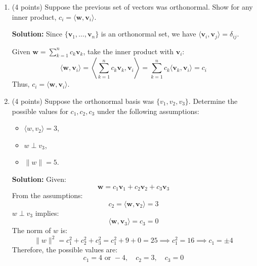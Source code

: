 \documentclass[12pt]{article}
\newcommand{\qspace}{\vspace{1em}} %
\newenvironment{solution}{\noindent\textbf{Solution:} }{\qspace}
\begin{document}
\begin{enumerate}
\begin{enumerate}
        \begin{solution}
        Suppose there exist two sets of scalars \( \{c_1, \ldots, c_n\} \) and \( \{c'_1, \ldots, c'_n\} \) such that:
        \[
        \mathbf{w} = \sum_{i=1}^n c_i \mathbf{v}_i = \sum_{i=1}^n c'_i \mathbf{v}_i
        \]
        Subtracting the equations:
        \[
        \sum_{i=1}^n (c_i - c'_i) \mathbf{v}_i = \mathbf{0}
        \]
        Since \( \{\mathbf{v}_1, \ldots, \mathbf{v}_n\} \) is linearly independent, it follows that \( c_i - c'_i = 0 \) for all \( i \). Therefore, \( c_i = c'_i \) for all \( i \), proving the uniqueness of the scalars.
        \end{solution}
        
        \item (4 points) Suppose the previous set of vectors was orthonormal. Show for any inner product, $
c_i = \langle \mathbf{w}, \mathbf{v}_i \rangle$.
    
        \begin{solution}
        Since \( \{\mathbf{v}_1, \ldots, \mathbf{v}_n\} \) is an orthonormal set, we have \( \langle \mathbf{v}_i, \mathbf{v}_j \rangle = \delta_{ij} \).

        Given \( \mathbf{w} = \sum_{k=1}^n c_k \mathbf{v}_k \), take the inner product with \( \mathbf{v}_i \):
        \[
        \langle \mathbf{w}, \mathbf{v}_i \rangle = \left\langle \sum_{k=1}^n c_k \mathbf{v}_k, \mathbf{v}_i \right\rangle = \sum_{k=1}^n c_k \langle \mathbf{v}_k, \mathbf{v}_i \rangle = c_i
        \]
        Thus, \( c_i = \langle \mathbf{w}, \mathbf{v}_i \rangle \).
        \end{solution}
        
        \item (4 points) Suppose the orthonormal basis was $\{ v_1, v_2, v_3\}$. Determine the possible values for $c_1, c_2, c_3$ under the following assumptions: 
        \begin{itemize}
            \item $\langle w, v_2 \rangle = 3$,
            \item $w \perp v_3$,
            \item $\lVert w \rVert = 5$.
        \end{itemize}
        
        \begin{solution}
        Given:
        \[
        \mathbf{w} = c_1 \mathbf{v}_1 + c_2 \mathbf{v}_2 + c_3 \mathbf{v}_3
        \]
        From the assumptions:
        \[
        c_2 = \langle \mathbf{w}, \mathbf{v}_2 \rangle = 3
        \]
        \( w \perp v_3 \) implies:
        \[
        \langle \mathbf{w}, \mathbf{v}_3 \rangle = c_3 = 0
        \]
        The norm of \( w \) is:
        \[
        \lVert w \rVert^2 = c_1^2 + c_2^2 + c_3^2 = c_1^2 + 9 + 0 = 25 \implies c_1^2 = 16 \implies c_1 = \pm 4
        \]
        Therefore, the possible values are:
        \[
        c_1 = 4 \text{ or } -4, \quad c_2 = 3, \quad c_3 = 0
        \]
        \end{solution}
    \end{enumerate}
    

\end{enumerate}
\end{document}
